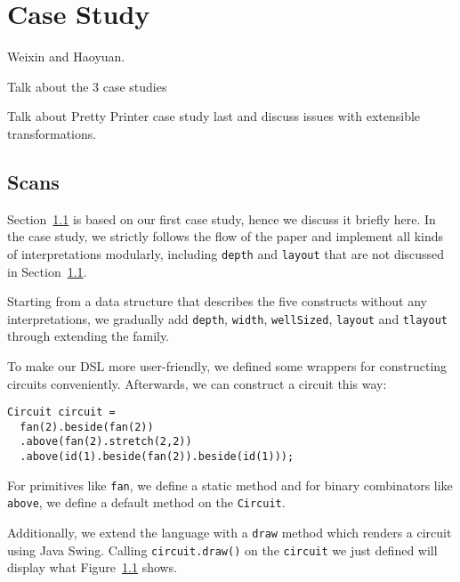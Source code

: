 \section{Case Study}

Weixin and Haoyuan.

Talk about the 3 case studies

Talk about Pretty Printer case study last and discuss issues with
extensible transformations.

\subsection{Scans}
Section~\ref{} is based on our first case study, hence we discuss it briefly here.
In the case study, we strictly follows the flow of the paper and implement all kinds of
interpretations modularly, including \texttt{depth} and \texttt{layout} that are
not discussed in Section~\ref{}.

Starting from a data structure that describes the five constructs without any interpretations, we gradually add
\texttt{depth}, \texttt{width}, \texttt{wellSized}, \texttt{layout} and
\texttt{tlayout} through extending the family.

To make our DSL more user-friendly, we defined some wrappers for constructing
circuits conveniently. Afterwards, we can construct a circuit this way:
\begin{lstlisting}
Circuit circuit =
  fan(2).beside(fan(2))
  .above(fan(2).stretch(2,2))
  .above(id(1).beside(fan(2)).beside(id(1)));
\end{lstlisting}
For primitives like \texttt{fan}, we define a static method and for binary
combinators like \texttt{above}, we define a default method on the \texttt{Circuit}.

Additionally, we extend the language with a \texttt{draw} method which renders a
circuit using Java Swing.
Calling \texttt{circuit.draw()} on the \texttt{circuit} we just defined will
display what Figure~\ref{} shows.

\begin{figure}
\end{figure}





